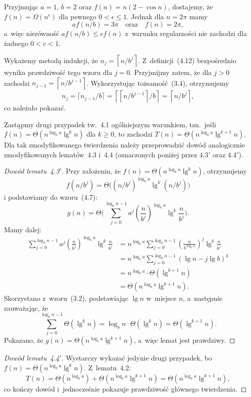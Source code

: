 \exercise %
Przyjmując $a=1$, $b=2$ oraz $f(n)=n(2-\cos n)$, dostajemy, że $f(n)=\Omega(n^\epsilon)$ dla pewnego $0<\epsilon\le1$. Jednak dla $n=2\pi$ mamy
\[
	af(n/b) = 3\pi \quad\text{oraz}\quad f(n) = 2\pi,
\]
a~więc nierówność $af(n/b)\le cf(n)$ z~warunku regularności nie zachodzi dla żadnego $0<c<1$.


\exercise %
Wykażemy metodą indukcji, że $n_j=\left\lceil n/b^j\right\rceil$. Z~definicji~(4.12) bezpośrednio wynika prawdziwość tego wzoru dla $j=0$. Przyjmijmy zatem, że dla $j>0$ zachodzi $n_{j-1}=\left\lceil n/b^{j-1}\right\rceil$. Wykorzystując tożsamość~(3.4), otrzymujemy
\[
	n_j = \lceil n_{j-1}/b\rceil = \left\lceil\left\lceil n/b^{j-1}\right\rceil\!/b\right\rceil = \left\lceil n/b^j\right\rceil,
\]
co należało pokazać.

\exercise %
Zastąpmy drugi przypadek tw.~4.1 ogólniejszym warunkiem, tzn.\ jeśli $f(n)=\Theta(n^{\log_ba}\lg^kn)$ dla $k\ge0$, to zachodzi $T(n)=\Theta(n^{\log_ba}\lg^{k+1}n)$. Dla tak zmodyfikowanego twierdzenia należy przeprowadzić dowód analogicznie zmodyfikowanych lematów~4.3 i~4.4 (oznaczonych poniżej przez 4.3$'$ oraz 4.4$'$).

\begin{proof}[Dowód lematu~4.3\/$'$]
	Przy założeniu, że $f(n)=\Theta(n^{\log_ba}\lg^kn)$, otrzymujemy
	\[
		f(n/b^j)=\Theta\bigl((n/b^j)^{\log_ba}\lg^k(n/b^j)\bigr)
	\]
	i podstawiamy do wzoru~(4.7):
	\[
		g(n) = \Theta\biggl(\sum_{j=0}^{\log_bn-1}a^j\left(\frac{n}{b^j}\right)^{\log_ba}\lg^k\frac{n}{b^j}\biggr).
	\]
	Mamy dalej:
	\begin{align*}
		\sum_{j=0}^{\log_bn-1}a^j\left(\frac{n}{b^j}\right)^{\log_ba}\lg^k\frac{n}{b^j} &= n^{\log_ba}\sum_{j=0}^{\log_bn-1}\left(\frac{a}{b^{\log_ba}}\right)^j\lg^k\frac{n}{b^j} \\
		&= n^{\log_ba}\sum_{j=0}^{\log_bn-1}(\lg n-j\lg b)^k \\
		&= n^{\log_ba}\cdot\Theta(\lg^{k+1}n) \\
		&= \Theta(n^{\log_ba}\lg^{k+1}n).
	\end{align*}
	Skorzystano z~wzoru~(3.2), podstawiając $\lg n$ w~miejsce $n$, a~następnie zauważając, że
	\[
		\sum_{j=0}^{\log_bn-1}\Theta(\lg^kn) = \log_bn\cdot\Theta(\lg^kn) = \Theta(\lg^{k+1}n).
	\]
	Pokazano, że $g(n)=\Theta(n^{\log_ba}\lg^{k+1}n)$, a~więc lemat jest prawdziwy.
\end{proof}

\begin{proof}[Dowód lematu~4.4\/$'$]
	Wystarczy wykazać jedynie drugi przypadek, bo $f(n)=\Theta(n^{\log_ba}\lg^kn)$. Z~lematu~4.2:
	\[
		T(n) = \Theta(n^{\log_ba})+\Theta(n^{\log_ba}\lg^{k+1}n) = \Theta(n^{\log_ba}\lg^{k+1}n),
	\]
	co kończy dowód i~jednocześnie pokazuje prawdziwość głównego twierdzenia.
\end{proof}

